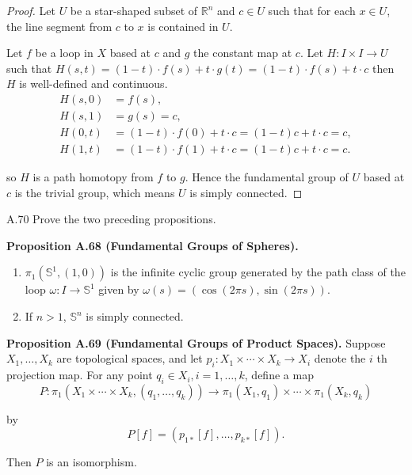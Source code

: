 \begin{proof}
    Let \( U \) be a star-shaped subset of \( \mathbb{R}^{n} \) and \( c \in U \) such that for each \( x \in U \), the line segment from \( c \) to \( x \) is contained in \( U \).

    Let \( f \) be a loop in \( X \) based at \( c \) and \( g \) the constant map at \( c \). Let \( H: I \times I \to U \) such that \( H(s, t) = (1 - t)\cdot f(s) + t\cdot g(t) = (1 - t)\cdot f(s) + t\cdot c \) then \( H \) is well-defined and continuous.
    \begingroup
    \allowdisplaybreaks%
    \begin{align*}
        H(s, 0) & = f(s),                                                   \\
        H(s, 1) & = g(s) = c,                                               \\
        H(0, t) & = (1 - t)\cdot f(0) + t\cdot c = (1 - t)c + t\cdot c = c, \\
        H(1, t) & = (1 - t)\cdot f(1) + t\cdot c = (1 - t)c + t\cdot c = c.
    \end{align*}
    \endgroup

    so \( H \) is a path homotopy from \( f \) to \( g \). Hence the fundamental group of \( U \) based at \( c \) is the trivial group, which means \( U \) is simply connected.
\end{proof}

\begin{exercise}{A.70}
    Prove the two preceding propositions.

    \textbf{Proposition A.68 (Fundamental Groups of Spheres).}
    \begin{enumerate}[itemsep=0pt,label={(\alph*)}]
        \item \( \pi_{1}(\mathbb{S}^{1}, (1, 0)) \) is the infinite cyclic group generated by the path class of the loop \( \omega: I \to \mathbb{S}^{1} \) given by \( \omega(s) = (\cos (2\pi s), \sin (2\pi s)) \).
        \item If \( n > 1 \), \( \mathbb{S}^{n} \) is simply connected.
    \end{enumerate}

    \textbf{Proposition A.69 (Fundamental Groups of Product Spaces).} Suppose \( X_{1}, \ldots, X_{k} \) are topological spaces, and let \( p_{i}: X_{1} \times \cdots \times X_{k} \to X_{i} \) denote the \( i \) th projection map. For any point \( q_{i} \in X_{i}, i = 1, \ldots, k \), define a map
    \[
        P: \pi_{1}(X_{1} \times \cdots \times X_{k}, (q_{1}, \ldots, q_{k})) \to \pi_{1}(X_{1}, q_{1}) \times \cdots \times \pi_{1}(X_{k}, q_{k})
    \]

    by
    \[
        P[f] = (p_{1\ast}[f], \ldots, p_{k\ast}[f]).
    \]

    Then \( P \) is an isomorphism.
\end{exercise}

